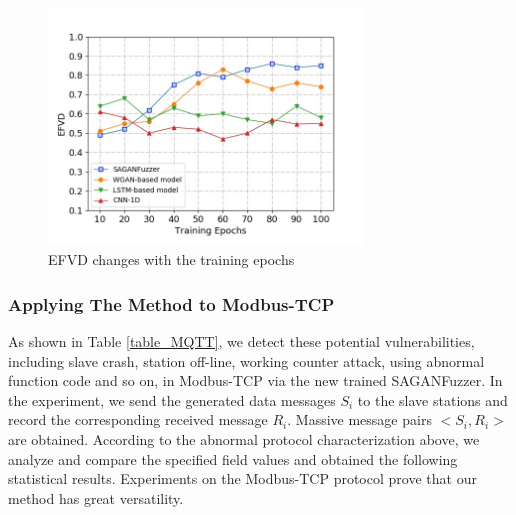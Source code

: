 \begin{figure}[htbp]
	\centering
	\includegraphics[width=3.3in]{FIGURE_EFVD.jpg}
	\caption{EFVD changes with the training epochs}
	\label{FIGURE_EFVD}
\end{figure}


\subsubsection{Applying The Method to Modbus-TCP}
As shown in Table \ref{table_MQTT}, we detect these potential vulnerabilities, including slave crash, station off-line, working counter attack, using abnormal function code and so on, in Modbus-TCP via the new trained SAGANFuzzer. In the experiment, we send the generated data messages $S_i$ to the slave stations and record the corresponding received message $R_i$. Massive message pairs $<S_i, R_i>$ are obtained. According to the abnormal protocol characterization above, we analyze and compare the specified field values and obtained the following statistical results. Experiments on the Modbus-TCP protocol prove that our method has great versatility.%


